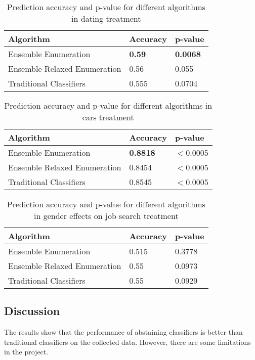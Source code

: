 \documentclass[12pt, journal]{IEEEtran}
\begin{document}
\begin{table}[t]
\centering
\caption{Prediction accuracy and p-value for different algorithms in dating treatment}
\label{dating}
\begin{tabular}{|l|l|l|}
\hline
Algorithm                    & Accuracy        & p-value         \\ \hline
Ensemble Enumeration         & \textbf{0.59}           & \textbf{0.0068}          \\ \hline
Ensemble Relaxed Enumeration & 0.56 & 0.055 \\ \hline
Traditional Classifiers      & 0.555           & 0.0704          \\ \hline
\end{tabular}
\end{table}

\begin{table}[t]
\centering
\caption{Prediction accuracy and p-value for different algorithms in cars treatment}
\label{cars}
\begin{tabular}{|l|l|l|}
\hline
Algorithm                    & Accuracy        & p-value         \\ \hline
Ensemble Enumeration         & \textbf{0.8818}          & $<$0.0005          \\ \hline
Ensemble Relaxed Enumeration & 0.8454 & $<$0.0005 \\ \hline
Traditional Classifiers      & 0.8545           &  $<$0.0005         \\ \hline
\end{tabular}
\end{table}

\begin{table}[t]
\centering
\caption{Prediction accuracy and p-value for different algorithms in gender effects on job search treatment}
\label{gender}
\begin{tabular}{|l|l|l|}
\hline
Algorithm                    & Accuracy        & p-value         \\ \hline
Ensemble Enumeration         & 0.515          & 0.3778          \\ \hline
Ensemble Relaxed Enumeration & 0.55 & 0.0973 \\ \hline
Traditional Classifiers      & 0.55           &  0.0929         \\ \hline
\end{tabular}
\end{table}

\subsection{Discussion}
The results show that the performance of abstaining classifiers is better than traditional classifiers on the collected data.
However, there are some limitations in the project.
\end{document}
